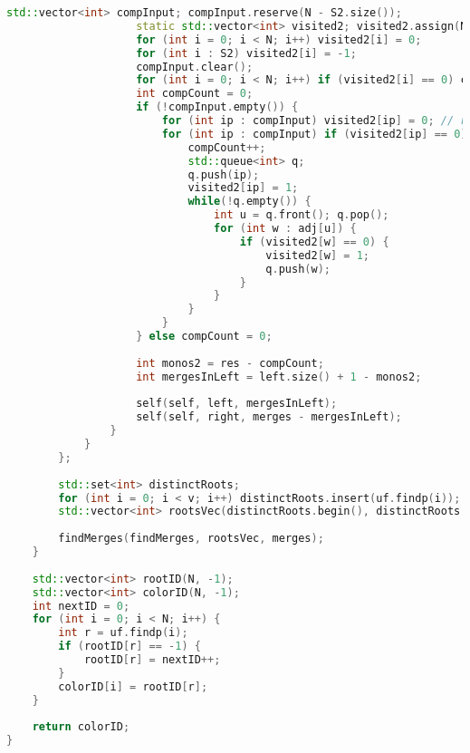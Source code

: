 \begin{lstlisting}[language=C++]
                    std::vector<int> compInput; compInput.reserve(N - S2.size());
                    static std::vector<int> visited2; visited2.assign(N, -1);
                    for (int i = 0; i < N; i++) visited2[i] = 0;
                    for (int i : S2) visited2[i] = -1;
                    compInput.clear();
                    for (int i = 0; i < N; i++) if (visited2[i] == 0) compInput.push_back(i);
                    int compCount = 0;
                    if (!compInput.empty()) {
                        for (int ip : compInput) visited2[ip] = 0; // re-mark for BFS.
                        for (int ip : compInput) if (visited2[ip] == 0) {
                            compCount++;
                            std::queue<int> q;
                            q.push(ip);
                            visited2[ip] = 1;
                            while(!q.empty()) {
                                int u = q.front(); q.pop();
                                for (int w : adj[u]) {
                                    if (visited2[w] == 0) {
                                        visited2[w] = 1;
                                        q.push(w);
                                    }
                                }
                            }
                        }
                    } else compCount = 0;
 
                    int monos2 = res - compCount;
                    int mergesInLeft = left.size() + 1 - monos2;
 
                    self(self, left, mergesInLeft);
                    self(self, right, merges - mergesInLeft);
                }
            }
        };
 
        std::set<int> distinctRoots;
        for (int i = 0; i < v; i++) distinctRoots.insert(uf.findp(i));
        std::vector<int> rootsVec(distinctRoots.begin(), distinctRoots.end());
 
        findMerges(findMerges, rootsVec, merges);
    }
 
    std::vector<int> rootID(N, -1);
    std::vector<int> colorID(N, -1);
    int nextID = 0;
    for (int i = 0; i < N; i++) {
        int r = uf.findp(i);
        if (rootID[r] == -1) {
            rootID[r] = nextID++;
        }
        colorID[i] = rootID[r];
    }
 
    return colorID;
}
\end{lstlisting}



